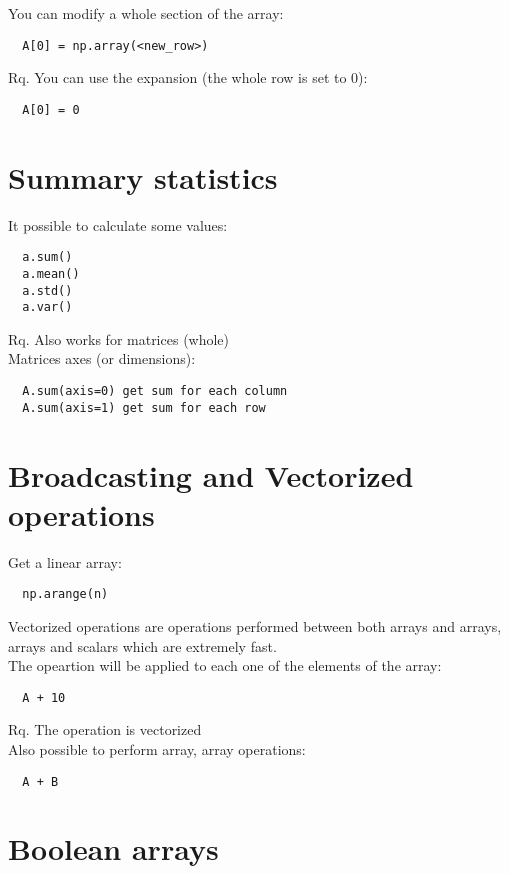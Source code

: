 \documentclass[french]{article}
\begin{document}
You can modify a whole section of the array:
\begin{verbatim}
  A[0] = np.array(<new_row>)
\end{verbatim}

Rq. You can use the expansion (the whole row is set to 0):
\begin{verbatim}
  A[0] = 0
\end{verbatim}

\section{Summary statistics}

It possible to calculate some values:
\begin{verbatim}
  a.sum()
  a.mean()
  a.std()
  a.var()
\end{verbatim}

Rq. Also works for matrices (whole)\\

Matrices axes (or dimensions):
\begin{verbatim}
  A.sum(axis=0) get sum for each column
  A.sum(axis=1) get sum for each row
\end{verbatim}

\section{Broadcasting and Vectorized operations}

Get a linear array:
\begin{verbatim}
  np.arange(n)
\end{verbatim}

Vectorized operations are operations performed between both arrays and arrays, arrays and scalars which are extremely fast.\\

The opeartion will be applied to each one of the elements of the array:
\begin{verbatim}
  A + 10
\end{verbatim}
Rq. The operation is vectorized\\

Also possible to perform array, array operations:
\begin{verbatim}
  A + B
\end{verbatim}

\section{Boolean arrays}
\end{document}
